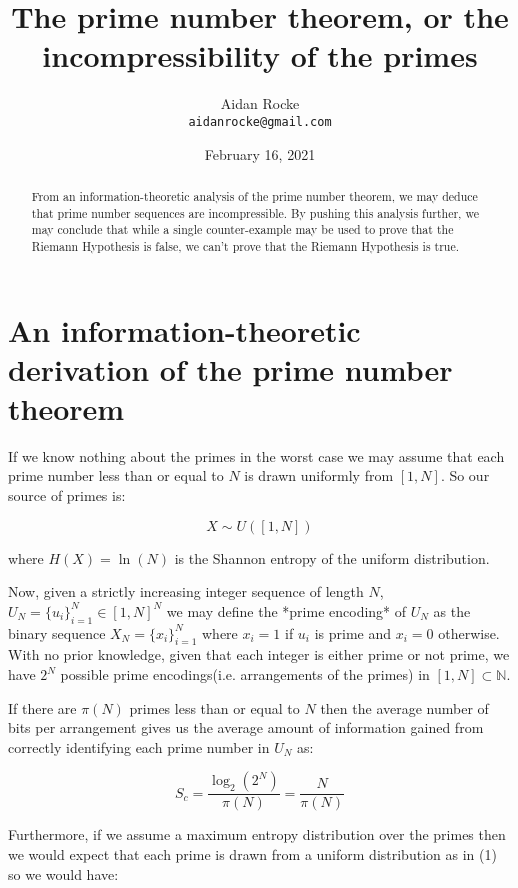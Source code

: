 \documentclass{article}
\title{The prime number theorem, or the incompressibility of the primes}
\date{February 16, 2021}
\author{%
  Aidan Rocke\\
  \texttt{aidanrocke@gmail.com} \\
}
\begin{document}
\maketitle

\begin{abstract}
   From an information-theoretic analysis of the prime number theorem, we may deduce that prime number sequences are incompressible. By pushing this analysis further, we may conclude that while a single counter-example may be used to prove that the Riemann Hypothesis is false, we can't prove that the Riemann Hypothesis is true. 
   \end{abstract}

\section{An information-theoretic derivation of the prime number theorem}

If we know nothing about the primes in the worst case we may assume that each prime number less than or equal to $N$ is drawn uniformly from $[1,N]$. So our source of primes is:

\begin{equation}
X \sim U([1,N])
\end{equation}

where $H(X) = \ln(N)$ is the Shannon entropy of the uniform distribution.  

Now, given a strictly increasing integer sequence of length $N$, $U_N = \{u_i\}_{i=1}^N \in [1,N]^N$ we may define the *prime encoding* of $U_N$ as the binary sequence $X_N = \{x_i\}_{i=1}^N$ where $x_i =1$ if $u_i$ is prime and
$x_i=0$ otherwise. With no prior knowledge, given that each integer is either prime or not prime,
we have $2^N$ possible prime encodings(i.e. arrangements of the primes) in $[1,N] \subset \mathbb{N}$.

If there are $\pi(N)$ primes less than or equal to $N$ then the average number of bits per arrangement gives us the average amount of information gained from correctly identifying each prime number in $U_N$ as:

\begin{equation}
S_c = \frac{\log_2 (2^N)}{\pi(N)}= \frac{N}{\pi(N)}
\end{equation}

Furthermore, if we assume a maximum entropy distribution over the primes then we would expect that each prime is drawn from a uniform distribution as in (1) so we would have:
\end{document}
